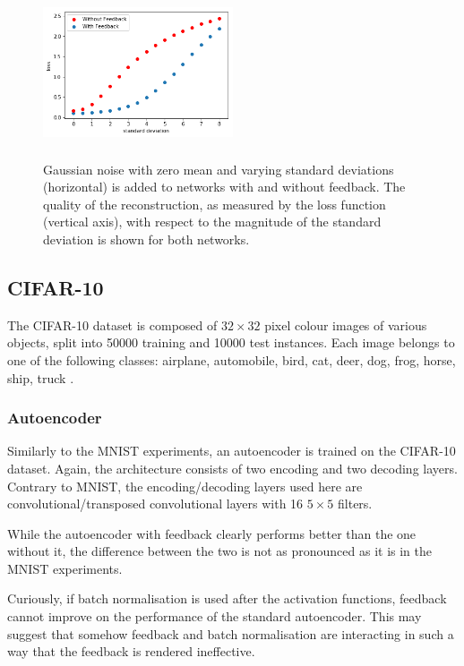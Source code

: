 \documentclass{article}
\begin{document}
  \begin{figure}
      \centering
      \includegraphics[width=0.5\textwidth,height=5cm,keepaspectratio]{img/actnoise_varstd.png}
      \caption{Gaussian noise with zero mean and varying standard deviations (horizontal) is added to networks with and without feedback. The quality of the reconstruction, as measured by the loss function (vertical axis), with respect to the magnitude of the standard deviation is shown for both networks. }
      \label{fig:noiseact}
  \end{figure}

  
\subsection{CIFAR-10}
The CIFAR-10 dataset is composed of $32\times32$ pixel colour images of various objects, split into 50000 training and 10000 test instances. Each image belongs to one of the following classes: airplane, automobile, bird, cat, deer, dog, frog, horse, ship, truck \cite{krizhevsky2014cifar}. 

\subsubsection{Autoencoder}
\label{cifarae}
Similarly to the MNIST experiments, an autoencoder is trained on the CIFAR-10 dataset. Again, the architecture consists of two encoding and two decoding layers. Contrary to MNIST, the encoding/decoding layers used here are convolutional/transposed convolutional layers with 16 $5 \times 5$ filters. 

While the autoencoder with feedback clearly performs better than the one without it, the difference between the two is not as pronounced as it is in the MNIST experiments.   

Curiously, if batch normalisation \cite{ioffe2015batch} is used after the activation functions, feedback cannot improve on the performance of the standard autoencoder. This may suggest that somehow feedback and batch normalisation are interacting in such a way that the feedback is rendered ineffective. 
\end{document}
